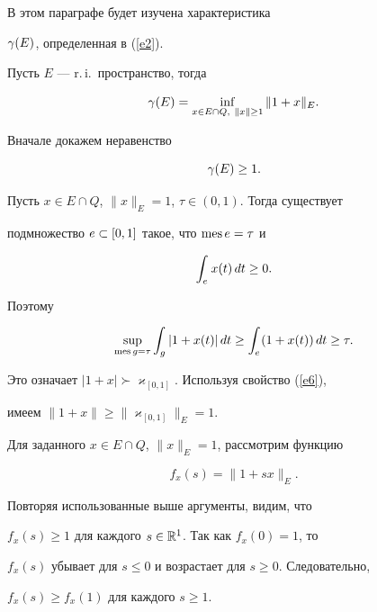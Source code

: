 В этом параграфе будет изучена характеристика


$\gamma(E)$, определенная в (\ref{e2}). 





\begin{lem}\label{l1}


Пусть $E$ --- r.\,i.\ пространство, тогда


$$


\gam (E) = \infl{x\in E\cap Q, \ \|x\|\ge 1} \|1 + x\|_E. 


$$


\end{lem}





\begin{pf}


Вначале докажем неравенство


\begin{equation}\label{e12}


\gam(E) \ge 1. 


\end{equation}


Пусть $x\in E \cap Q$, $\|x\|_E =1$, $\tau \in (0, 1)$. Тогда существует 


подмножество $e\subset [0,1]$ такое, что $\operatorname{mes} e =\tau$ и


$$


\intl{e}{} x(t)\, dt \ge 0. 


$$


Поэтому


$$


\supl{\mes g = \tau} \intl{g}{} |1 + x(t)|\, dt \ge 


\intl{e}{}(1+x(t))\, dt\ge \tau. 


$$


Это означает $|1 + x|\succ \varkappa_{[0,1]}$. Используя свойство (\ref{e6}), 


имеем $\|1 + x\|\ge \|\varkappa_{[0,1]} \|_E =1$. 





Для заданного $x\in E \cap Q$, $\|x\|_E =1$, рассмотрим функцию


$$


f_x (s) = \|1 + sx\|_E. 


$$


Повторяя использованные выше аргументы, видим, что 


$f_x (s)\ge 1$ для каждого $s\in \Bbb R^1$. Так как $f_x (0) =1$, то 


$f_x (s)$ убывает для $s\le 0$ и возрастает для $s\ge 0$. Следовательно,


$f_x (s) \ge f_x (1)$ для каждого $s\ge 1$.


\end{pf}








